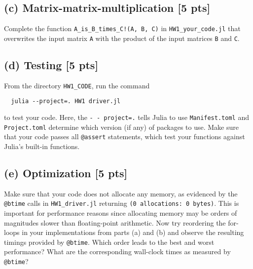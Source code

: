 \documentclass[twoside,10pt]{article}
\begin{document}
\subsection*{(c) Matrix-matrix-multiplication [5 pts]} 
Complete the function \texttt{A\_is\_B\_times\_C!(A, B, C)} in \texttt{HW1\_your\_code.jl} that overwrites the input matrix \texttt{A} with the product of the input matrices \texttt{B} and \texttt{C}.

\subsection*{(d) Testing [5 pts]}
From the directory \texttt{HW1\_CODE}, run the command 
\begin{verbatim}
  julia --project=. HW1 driver.jl
\end{verbatim}
to test your code. Here, the \texttt{-\,-\,project=.} tells Julia to use \texttt{Manifest.toml} and \texttt{Project.toml} determine which version (if any) of packages to use.
Make sure that your code passes all \texttt{@assert} statements, which test your functions against Julia's built-in functions.

\subsection*{(e) Optimization [5 pts]} 
Make sure that your code does not allocate any memory, as evidenced by the \texttt{@btime} calls in \texttt{HW1\_driver.jl} returning \texttt{(0\,allocations:\,0\,bytes)}.
This is important for performance reasons since allocating memory may be orders of magnitudes slower than floating-point arithmetic. 
Now try reordering the for-loops in your implementations from parts (a) and (b) and observe the resulting timings provided by \texttt{@btime}. 
Which order leads to the best and worst performance? 
What are the corresponding wall-clock times as measured by \texttt{@btime}? 

















%
%
\end{document}
